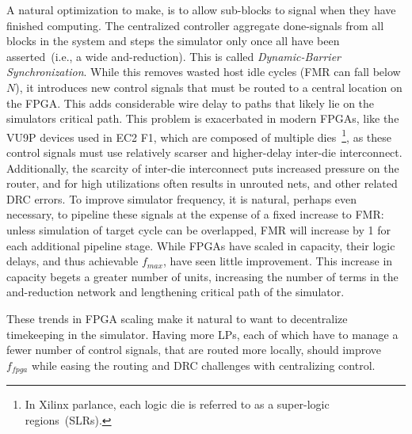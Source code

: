 A natural optimization to make, is to allow sub-blocks to signal when they have
finished computing.  The centralized controller aggregate done-signals from all
blocks in the system and steps the simulator only once all have been
asserted~(i.e., a wide and-reduction).  This is called \emph{Dynamic-Barrier
Synchronization}. While this removes wasted host idle cycles (FMR can fall
below $N$), it introduces new control signals that must be routed to a central
location on the FPGA. This adds considerable wire delay to paths that likely
lie on the simulators critical path. This problem is exacerbated in modern
FPGAs, like the VU9P devices used in EC2 F1, which are composed of multiple
dies~\footnote{In Xilinx parlance, each logic die is referred to as a
super-logic regions~(SLRs).}, as these control signals must use relatively
scarser and higher-delay inter-die interconnect. Additionally, the scarcity of inter-die interconnect
puts increased pressure on the router, and for high utilizations often results
in unrouted nets, and other related DRC errors.  To improve simulator
frequency, it is natural, perhaps even necessary, to pipeline these signals at
the expense of a fixed increase to FMR: unless simulation of target cycle can
be overlapped, FMR will increase by 1 for each additional pipeline stage. While
FPGAs have scaled in capacity, their logic delays, and thus achievable
$f_{max}$, have seen little improvement. This increase in capacity begets a
greater number of units, increasing the number of terms in the and-reduction
network and lengthening critical path of the simulator.

These trends in FPGA scaling make it natural to want to decentralize
timekeeping in the simulator.  Having more LPs, each of which have to manage a
fewer number of control signals, that are routed more locally, should improve
${f_{fpga}}$ while easing the routing and DRC challenges with centralizing
control.

